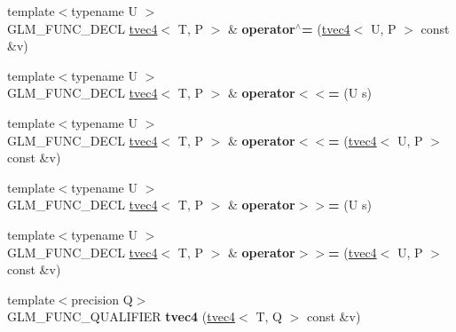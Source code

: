\begin{DoxyCompactItemize}
\item 
\hypertarget{structglm_1_1detail_1_1tvec4_a5e3b455605338080eaedad86af4eb38e}{{\footnotesize template$<$typename U $>$ }\\G\-L\-M\-\_\-\-F\-U\-N\-C\-\_\-\-D\-E\-C\-L \hyperlink{structglm_1_1detail_1_1tvec4}{tvec4}$<$ T, P $>$ \& {\bfseries operator$^\wedge$=} (\hyperlink{structglm_1_1detail_1_1tvec4}{tvec4}$<$ U, P $>$ const \&v)}\label{structglm_1_1detail_1_1tvec4_a5e3b455605338080eaedad86af4eb38e}

\item 
\hypertarget{structglm_1_1detail_1_1tvec4_a710de783451759b12b3e5a5764833cbf}{{\footnotesize template$<$typename U $>$ }\\G\-L\-M\-\_\-\-F\-U\-N\-C\-\_\-\-D\-E\-C\-L \hyperlink{structglm_1_1detail_1_1tvec4}{tvec4}$<$ T, P $>$ \& {\bfseries operator$<$$<$=} (U s)}\label{structglm_1_1detail_1_1tvec4_a710de783451759b12b3e5a5764833cbf}

\item 
\hypertarget{structglm_1_1detail_1_1tvec4_a42e78a66bcb14999e38ff18ccfcd14d1}{{\footnotesize template$<$typename U $>$ }\\G\-L\-M\-\_\-\-F\-U\-N\-C\-\_\-\-D\-E\-C\-L \hyperlink{structglm_1_1detail_1_1tvec4}{tvec4}$<$ T, P $>$ \& {\bfseries operator$<$$<$=} (\hyperlink{structglm_1_1detail_1_1tvec4}{tvec4}$<$ U, P $>$ const \&v)}\label{structglm_1_1detail_1_1tvec4_a42e78a66bcb14999e38ff18ccfcd14d1}

\item 
\hypertarget{structglm_1_1detail_1_1tvec4_aff212ccd60efa8fa3a4c7e642afa6046}{{\footnotesize template$<$typename U $>$ }\\G\-L\-M\-\_\-\-F\-U\-N\-C\-\_\-\-D\-E\-C\-L \hyperlink{structglm_1_1detail_1_1tvec4}{tvec4}$<$ T, P $>$ \& {\bfseries operator$>$$>$=} (U s)}\label{structglm_1_1detail_1_1tvec4_aff212ccd60efa8fa3a4c7e642afa6046}

\item 
\hypertarget{structglm_1_1detail_1_1tvec4_ad8f7d2a8465cfd294b47b33639127ebf}{{\footnotesize template$<$typename U $>$ }\\G\-L\-M\-\_\-\-F\-U\-N\-C\-\_\-\-D\-E\-C\-L \hyperlink{structglm_1_1detail_1_1tvec4}{tvec4}$<$ T, P $>$ \& {\bfseries operator$>$$>$=} (\hyperlink{structglm_1_1detail_1_1tvec4}{tvec4}$<$ U, P $>$ const \&v)}\label{structglm_1_1detail_1_1tvec4_ad8f7d2a8465cfd294b47b33639127ebf}

\item 
\hypertarget{structglm_1_1detail_1_1tvec4_a3030b13b21c84c52f89f14f802ae99f5}{{\footnotesize template$<$precision Q$>$ }\\G\-L\-M\-\_\-\-F\-U\-N\-C\-\_\-\-Q\-U\-A\-L\-I\-F\-I\-E\-R {\bfseries tvec4} (\hyperlink{structglm_1_1detail_1_1tvec4}{tvec4}$<$ T, Q $>$ const \&v)}\label{structglm_1_1detail_1_1tvec4_a3030b13b21c84c52f89f14f802ae99f5}


\end{DoxyCompactItemize}
